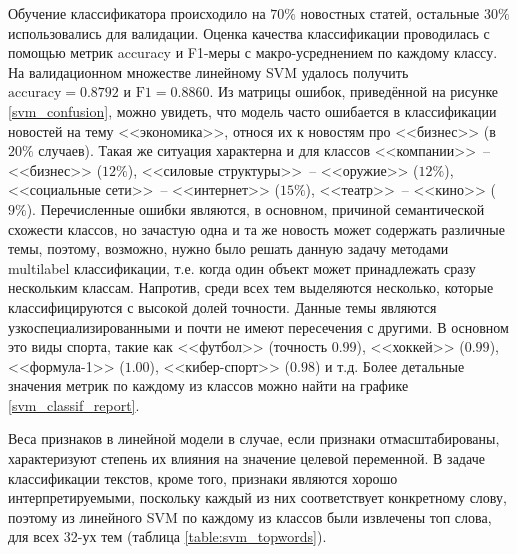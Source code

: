 \documentclass[a4paper, 14pt]{extarticle}
\begin{document}
Обучение классификатора происходило на $70\%$ новостных статей, остальные $30\%$ использовались для валидации.
Оценка качества классификации проводилась с помощью метрик accuracy и F1-меры с макро-усреднением по каждому классу.
На валидационном множестве линейному SVM удалось получить $\text{accuracy} = 0.8792$ и $\text{F1} = 0.8860$. Из матрицы ошибок,
приведённой на рисунке \ref{svm_confusion}, можно увидеть, что модель часто ошибается в классификации новостей на тему <<экономика>>, относя их
к новостям про <<бизнес>> (в $20\%$ случаев). Такая же ситуация характерна и для классов <<компании>>~-- <<бизнес>> ($12\%$), <<силовые 
структуры>>~-- <<оружие>> ($12\%$),  <<социальные сети>>~-- <<интернет>> ($15\%$), <<театр>>~-- <<кино>> ($9\%$). Перечисленные ошибки
являются, в основном, причиной семантической схожести классов, но зачастую одна и та же новость может содержать различные темы, поэтому,
возможно, нужно было решать данную задачу методами multilabel классификации, т.е. когда один объект может принадлежать сразу
нескольким классам. Напротив, среди всех тем выделяются несколько, которые классифицируются с высокой долей точности. Данные темы являются
узкоспециализированными и почти не имеют пересечения с другими. В основном это виды спорта, такие как <<футбол>> (точность $0.99$), <<хоккей>> 
($0.99$), <<формула-1>> ($1.00$), <<кибер-спорт>> ($0.98$) и т.д. Более детальные
значения метрик по каждому из классов можно найти на графике \ref{svm_classif_report}.

Веса признаков в линейной модели в случае, если признаки отмасштабированы, характеризуют степень их влияния на значение целевой переменной.
В задаче классификации текстов, кроме того, признаки являются хорошо интерпретируемыми, поскольку каждый из них соответствует конкретному слову,
поэтому из линейного SVM по каждому из классов были извлечены топ слова, для всех  32-ух тем (таблица \ref{table:svm_topwords}). 
%
%
%
%
%
%
%
%
\end{document}

